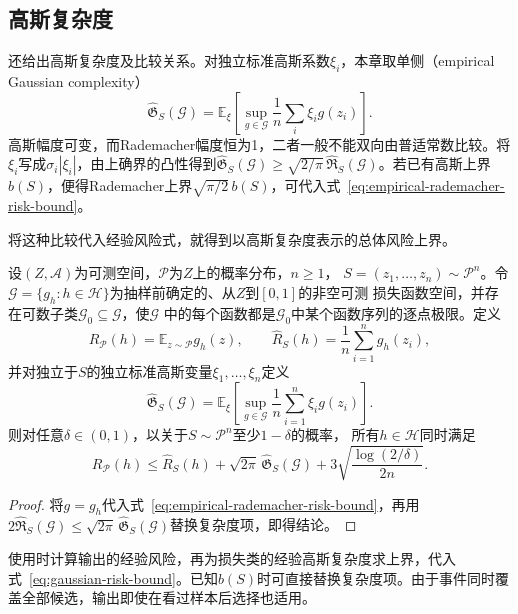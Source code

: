 \subsection{高斯复杂度}

还给出高斯复杂度及比较关系。对独立标准高斯系数$\xi_i$，本章取单侧（empirical Gaussian complexity）
\[
 \widehat{\mathfrak G}_S(\mathcal G)
 =\mathbb E_\xi\left[\sup_{g\in\mathcal G}\frac1n\sum_i \xi_i g(z_i)\right].
\]
高斯幅度可变，而Rademacher幅度恒为1，二者一般不能双向由普适常数比较。将$\xi_i$写成$\sigma_i|\xi_i|$，由上确界的凸性得到$\widehat{\mathfrak G}_S(\mathcal G)\geq\sqrt{2/\pi}\,\widehat{\mathfrak R}_S(\mathcal G)$。若已有高斯上界$b(S)$，便得Rademacher上界$\sqrt{\pi/2}\,b(S)$，可代入式~\eqref{eq:empirical-rademacher-risk-bound}。

将这种比较代入经验风险式，就得到以高斯复杂度表示的总体风险上界。

\begin{theorem}[高斯复杂度给出的期望风险上界]
\label{thm:gaussian-risk-bound}
设$(Z,\mathcal A)$为可测空间，$\mathcal P$为$Z$上的概率分布，$n\geq1$，
$S=(z_1,\ldots,z_n)\sim\mathcal P^n$。令
$\mathcal G=\{g_h:h\in\mathcal H\}$为抽样前确定的、从$Z$到$[0,1]$的非空可测
损失函数空间，并存在可数子类$\mathcal G_0\subseteq\mathcal G$，使$\mathcal G$
中的每个函数都是$\mathcal G_0$中某个函数序列的逐点极限。定义
\[
 R_{\mathcal P}(h)=\mathbb E_{z\sim\mathcal P}g_h(z),\qquad
 \hat R_S(h)=\frac1n\sum_{i=1}^n g_h(z_i),
\]
并对独立于$S$的独立标准高斯变量$\xi_1,\ldots,\xi_n$定义
\[
 \widehat{\mathfrak G}_S(\mathcal G)
 =\mathbb E_\xi\left[\sup_{g\in\mathcal G}
   \frac1n\sum_{i=1}^n\xi_i g(z_i)\right].
\]
则对任意$\delta\in(0,1)$，以关于$S\sim\mathcal P^n$至少$1-\delta$的概率，
所有$h\in\mathcal H$同时满足
\begin{equation}
 R_{\mathcal P}(h)\leq\hat R_S(h)
 +\sqrt{2\pi}\,\widehat{\mathfrak G}_S(\mathcal G)
 +3\sqrt{\frac{\log(2/\delta)}{2n}}.
 \label{eq:gaussian-risk-bound}
\end{equation}
\end{theorem}

\begin{proof}
将$g=g_h$代入式~\eqref{eq:empirical-rademacher-risk-bound}，再用$2\widehat{\mathfrak R}_S(\mathcal G)\leq\sqrt{2\pi}\,\widehat{\mathfrak G}_S(\mathcal G)$替换复杂度项，即得结论。
\end{proof}

使用时计算输出的经验风险，再为损失类的经验高斯复杂度求上界，代入式~\eqref{eq:gaussian-risk-bound}。已知$b(S)$时可直接替换复杂度项。由于事件同时覆盖全部候选，输出即使在看过样本后选择也适用。

